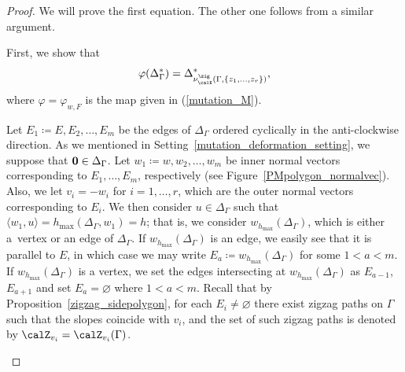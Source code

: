 \begin{proof}We will prove the first equation. The other one follows from a similar argument.

First, we show that
\begin{displaymath}
\varphi(\Delta_\Gamma^*)=\Delta_{\nu^\zig_\calX(\Gamma,\{z_1,\dots,z_r\})}^*,
\end{displaymath}
where $\varphi=\varphi_{w,F}$ is the map given in (\ref{mutation_M}).

Let $E_1\coloneqq E, E_2,\dots,E_m$ be the edges of $\Delta_\Gamma$ ordered cyclically in the anti-clockwise direction.
As we mentioned in Setting~\ref{mutation_deformation_setting}, we suppose that ${\bf 0}\in\Delta_\Gamma$.
Let $w_1\coloneqq w,w_2, \dots, w_m$ be inner normal vectors corresponding to $E_1,\dots,E_m$, respectively (see Figure~\ref{PMpolygon_normalvec}).
Also, we let $v_i=-w_i$ for $i=1,\dots,r$, which are the outer normal vectors corresponding to $E_i$.
We then consider $u\in\Delta_\Gamma$ such that $\langle w_1,u\rangle=h_{\max}(\Delta_\Gamma,w_1)=h$; that is, we consider $w_{h_{\max}}(\Delta_\Gamma)$, which is either a~vertex or an edge of $\Delta_\Gamma$.
If $w_{h_{\max}}(\Delta_\Gamma)$ is an edge, we easily see that it is parallel to $E$, in which case we may write $E_a\coloneqq w_{h_{\max}}(\Delta_\Gamma)$ for some $1<a<m$.
If $w_{h_{\max}}(\Delta_\Gamma)$ is a vertex, we set the edges intersecting at $w_{h_{\max}}(\Delta_\Gamma)$ as $E_{a-1}$, $E_{a+1}$ and set $E_a=\varnothing$ where $1<a<m$.
Recall that by Proposition~\ref{zigzag_sidepolygon}, for each $E_i\neq\varnothing$ there exist zigzag paths on $\Gamma$ such that the slopes coincide with $v_i$,
and the set of such zigzag paths is denoted by $\calZ_{v_i}=\calZ_{v_i}(\Gamma)$.

\begin{figure}[h!]\centering
{}
\end{figure}
\end{proof}

